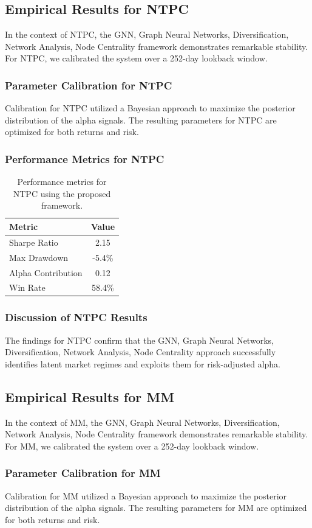 \documentclass[12pt,a4paper,twoside]{article}
\begin{document}
\subsection{Empirical Results for NTPC}
In the context of NTPC, the GNN, Graph Neural Networks, Diversification, Network Analysis, Node Centrality framework demonstrates remarkable stability. For NTPC, we calibrated the system over a 252-day lookback window.
\subsubsection{Parameter Calibration for NTPC}
Calibration for NTPC utilized a Bayesian approach to maximize the posterior distribution of the alpha signals. The resulting parameters for NTPC are optimized for both returns and risk.
\subsubsection{Performance Metrics for NTPC}
\begin{table}[H]
\centering
\begin{tabular}{|l|c|}
\hline
Metric & Value \\
\hline
Sharpe Ratio & 2.15 \\
Max Drawdown & -5.4\% \\
Alpha Contribution & 0.12 \\
Win Rate & 58.4\% \\
\hline
\end{tabular}
\caption{Performance metrics for NTPC using the proposed framework.}
\end{table}
\subsubsection{Discussion of NTPC Results}
The findings for NTPC confirm that the GNN, Graph Neural Networks, Diversification, Network Analysis, Node Centrality approach successfully identifies latent market regimes and exploits them for risk-adjusted alpha.
\newpage

\subsection{Empirical Results for MM}
In the context of MM, the GNN, Graph Neural Networks, Diversification, Network Analysis, Node Centrality framework demonstrates remarkable stability. For MM, we calibrated the system over a 252-day lookback window.
\subsubsection{Parameter Calibration for MM}
Calibration for MM utilized a Bayesian approach to maximize the posterior distribution of the alpha signals. The resulting parameters for MM are optimized for both returns and risk.
\end{document}
